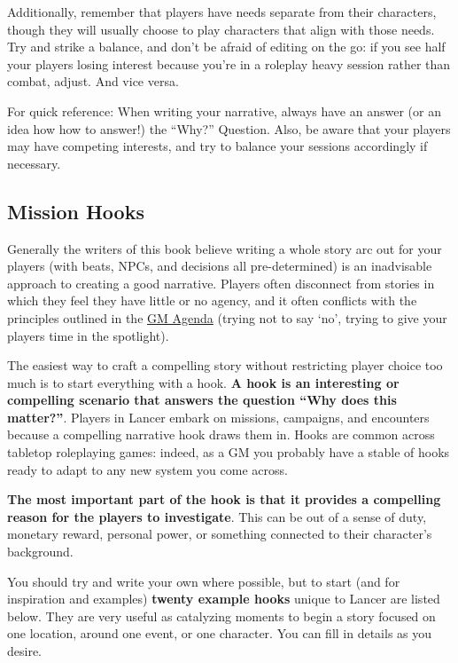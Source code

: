Additionally, remember that players have needs separate from their characters, though they will
usually choose to play characters that align with those needs. Try and strike a balance, and don't
be afraid of editing on the go: if you see half your players losing interest because you're in a
roleplay heavy session rather than combat, adjust. And vice versa.

For quick reference: When writing your narrative, always have an answer (or an idea how how to
answer!) the ``Why?'' Question. Also, be aware that your players may have competing interests,
and try to balance your sessions accordingly if necessary.

\subsection{Mission Hooks}

Generally the writers of this book believe writing a whole story arc out for your players (with
beats, NPCs, and decisions all pre-determined) is an inadvisable approach to creating a good
narrative. Players often disconnect from stories in which they feel they have little or no agency,
and it often conflicts with the principles outlined in the \hyperlink{GMAgenda}{GM Agenda} (trying not to say `no', trying
to give your players time in the spotlight).


The easiest way to craft a compelling story without restricting player choice too much is to start
everything with a hook. \textbf{A hook is an interesting or compelling scenario that answers the
question ``Why does this matter?''}. Players in Lancer embark on missions, campaigns, and
encounters because a compelling narrative hook draws them in. Hooks are common across
tabletop roleplaying games: indeed, as a GM you probably have a stable of hooks ready to adapt
to any new system you come across.


\textbf{The most important part of the hook is that it provides a compelling reason for the players
to investigate}. This can be out of a sense of duty, monetary reward, personal power, or
something connected to their character's background.


You should try and write your own where possible, but to start (and for inspiration and examples)
\textbf{twenty example hooks} unique to Lancer are listed below. They are very useful as catalyzing
moments to begin a story focused on one location, around one event, or one character. You can
fill in details as you desire.


